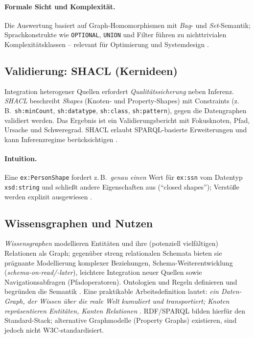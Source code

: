 \paragraph{Formale Sicht und Komplexität.}
Die Auswertung basiert auf Graph-Homomorphismen mit \emph{Bag}- und \emph{Set}-Semantik; Sprachkonstrukte wie \texttt{OPTIONAL}, \texttt{UNION} und Filter führen zu nichttrivialen Komplexitätsklassen -- relevant für Optimierung und Systemdesign \cite{PerezGutierrez}.

\subsection{Validierung: SHACL (Kernideen)}

Integration heterogener Quellen erfordert \emph{Qualitätssicherung} neben Inferenz. \emph{SHACL} beschreibt \emph{Shapes} (Knoten- und Property-Shapes) mit Constraints (z.\,B.\ \texttt{sh:minCount}, \texttt{sh:datatype}, \texttt{sh:class}, \texttt{sh:pattern}), gegen die Datengraphen validiert werden. Das Ergebnis ist ein Validierungsbericht mit Fokusknoten, Pfad, Ursache und Schweregrad. SHACL erlaubt SPARQL-basierte Erweiterungen und kann Inferenzregime berücksichtigen \cite{SHACL12}.

\paragraph{Intuition.} Eine \texttt{ex:PersonShape} fordert z.\,B.\ \emph{genau einen} Wert für \texttt{ex:ssn} vom Datentyp \texttt{xsd:string} und schließt andere Eigenschaften aus (``closed shapes''); Verstöße werden explizit ausgewiesen \cite{SHACL12}.

\subsection{Wissensgraphen und Nutzen}

\emph{Wissensgraphen} modellieren Entitäten und ihre (potenziell vielfältigen) Relationen als Graph; gegenüber streng relationalen Schemata bieten sie prägnante Modellierung komplexer Beziehungen, Schema-Weiterentwicklung (\emph{schema-on-read/-later}), leichtere Integration neuer Quellen sowie Navigationsabfragen (Pfadoperatoren). Ontologien und Regeln definieren und begründen die Semantik \cite{HoganKG}. Eine praktikable Arbeitsdefinition lautet: \emph{ein Daten-Graph, der Wissen über die reale Welt kumuliert und transportiert; Knoten repräsentieren Entitäten, Kanten Relationen} \cite{HoganKG}. RDF/SPARQL bilden hierfür den Standard-Stack; alternative Graphmodelle (Property Graphs) existieren, sind jedoch nicht W3C-standardisiert.

